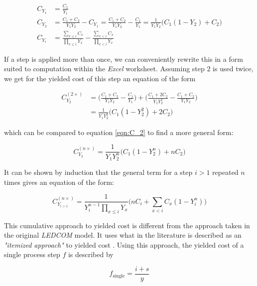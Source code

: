 \documentclass[10pt]{article}
\begin{document}
\begin{equation}
\begin{split}
\label{eqn:C_2}
    C_{Y_1} &= \frac{C_1}{Y_1} \\
    C_{Y_2} &= \frac{C_1 + C_2}{Y_1 Y_2} - C_{Y_1} = \frac{C_1 + C_2}{Y_1 Y_2} - \frac{C_1}{Y_1} = \frac{1}{Y_1 Y_2} \bigg ( C_1 (1-Y_2) +C_2 \bigg)\\
    C_{Y_i} &= \frac{ \sum_{x \leq i} C_x }{ \prod_{x \leq i} Y_x } - \frac{ \sum_{x<i} C_x }{ \prod_{x<i} Y_x }
\end{split}
\end{equation}

If a step is applied more than once, we can conveniently rewrite this in a form suited to computation within the \textit{Excel} worksheet. Assuming step $2$ is used twice, we get for the yielded cost of this step an equation of the form

\begin{align}
\label{eqn:C_2^2}
    C_{Y_2}^{(2 \times)} &= \bigg( \frac{C_1 + C_2}{Y_1 Y_2} - \frac{C_1}{Y_1} \bigg) + \bigg( \frac{C_1 + 2 C_2}{Y_1 Y_2^2} - \frac{C_1 + C_2}{Y_1 Y_2}     \bigg) \\
    &= \frac{1}{Y_1 Y_2^2} \bigg( C_1 (1-Y_2^2) +2C_2 \bigg)
\end{align}

which can be compared to equation \cref{eqn:C_2} to find a more general form:

\begin{equation}
    C_{Y_2}^{(n \times)} = \frac{1}{Y_1 Y_2^n} \bigg( C_1 (1-Y_2^n)+nC_2\bigg)
\end{equation}

It can be shown by induction that the general term for a step $i>1$ repeated $n$ times gives an equation of the form:

\begin{equation}
\label{eqn:yielded_cost}
    C_{Y_{i>1}}^{(n \times)} = \frac{1}{Y_i^{n-1} \prod_{x \leq i} Y_x} \bigg( nC_i + \sum_{x < i} C_x (1-Y_i^n) \bigg)
\end{equation}

This cumulative approach to yielded cost is different from the approach taken in the original \textit{LEDCOM} model. It uses what in the literature is described as an \textit{"itemized approach"} to yielded cost \cite{becker2001use}. Using this approach, the yielded cost of a single process step $f$ is described by

\begin{equation}
	f_\text{single} = \frac{i+s}{y}
\end{equation}
\end{document}
